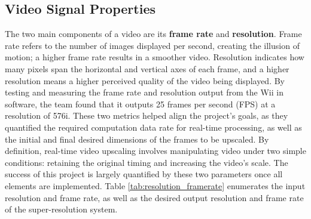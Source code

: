 \documentclass{article}
\begin{document}
    \subsection{Video Signal Properties}
    \noindent The two main components of a video are its \textbf{frame rate} and \textbf{resolution}. Frame rate refers to the number of images displayed per second, creating the illusion of motion; a higher frame rate results in a smoother video. Resolution indicates how many pixels span the horizontal and vertical axes of each frame, and a higher resolution means a higher perceived quality of the video being displayed. By testing and measuring the frame rate and resolution output from the Wii in software, the team found that it outputs 25 frames per second (FPS) at a resolution of 576i. These two metrics helped align the project's goals, as they quantified the required computation data rate for real-time processing, as well as the initial and final desired dimensions of the frames to be upscaled. By definition, real-time video upscaling involves manipulating video under two simple conditions: retaining the original timing and increasing the video's scale. The success of this project is largely quantified by these two parameters once all elements are implemented. Table \ref{tab:resolution_framerate} enumerates the input resolution and frame rate, as well as the desired output resolution and frame rate of the super-resolution system.

    \begin{table}[h]
    \centering
    \caption{Input and output desired resolution and frame rate for the super-resolution system.}
    \label{tab:your_label}
    \end{table}
\end{document}
